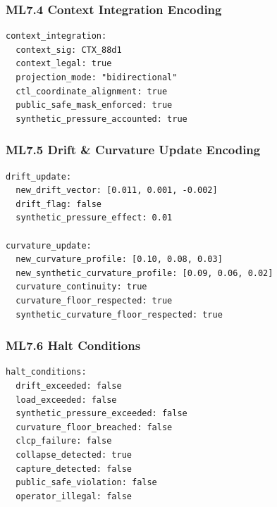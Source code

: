 
\subsubsection*{ML7.4 Context Integration Encoding}

\begin{verbatim}
context_integration:
  context_sig: CTX_88d1
  context_legal: true
  projection_mode: "bidirectional"
  ctl_coordinate_alignment: true
  public_safe_mask_enforced: true
  synthetic_pressure_accounted: true
\end{verbatim}



\subsubsection*{ML7.5 Drift \& Curvature Update Encoding}

\begin{verbatim}
drift_update:
  new_drift_vector: [0.011, 0.001, -0.002]
  drift_flag: false
  synthetic_pressure_effect: 0.01

curvature_update:
  new_curvature_profile: [0.10, 0.08, 0.03]
  new_synthetic_curvature_profile: [0.09, 0.06, 0.02]
  curvature_continuity: true
  curvature_floor_respected: true
  synthetic_curvature_floor_respected: true
\end{verbatim}


\subsubsection*{ML7.6 Halt Conditions}

\begin{verbatim}
halt_conditions:
  drift_exceeded: false
  load_exceeded: false
  synthetic_pressure_exceeded: false
  curvature_floor_breached: false
  clcp_failure: false
  collapse_detected: true
  capture_detected: false
  public_safe_violation: false
  operator_illegal: false
\end{verbatim}

